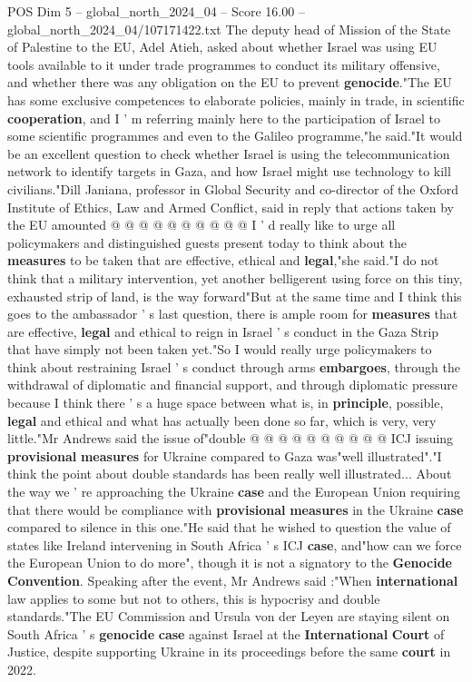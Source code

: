 \begin{textsample}{POS Dim 5 – global\_north\_2024\_04 – Score 16.00 – global\_north\_2024\_04/107171422.txt}
The deputy head of Mission of the State of Palestine to the EU, Adel Atieh, asked about whether Israel was using EU tools available to it under trade programmes to conduct its military offensive, and whether there was any obligation on the EU to prevent \textbf{genocide}."The EU has some exclusive competences to elaborate policies, mainly in trade, in scientific \textbf{cooperation}, and I ' m referring mainly here to the participation of Israel to some scientific programmes and even to the Galileo programme,"he said."It would be an excellent question to check whether Israel is using the telecommunication network to identify targets in Gaza, and how Israel might use technology to kill civilians."Dill Janiana, professor in Global Security and co-director of the Oxford Institute of Ethics, Law and Armed Conflict, said in reply that actions taken by the EU amounted @ @ @ @ @ @ @ @ @ @ I ' d really like to urge all policymakers and distinguished guests present today to think about the \textbf{measures} to be taken that are effective, ethical and \textbf{legal},"she said."I do not think that a military intervention, yet another belligerent using force on this tiny, exhausted strip of land, is the way forward"But at the same time and I think this goes to the ambassador ' s last question, there is ample room for \textbf{measures} that are effective, \textbf{legal} and ethical to reign in Israel ' s conduct in the Gaza Strip that have simply not been taken yet."So I would really urge policymakers to think about restraining Israel ' s conduct through arms \textbf{embargoes}, through the withdrawal of diplomatic and financial support, and through diplomatic pressure because I think there ' s a huge space between what is, in \textbf{principle}, possible, \textbf{legal} and ethical and what has actually been done so far, which is very, very little."Mr Andrews said the issue of"double @ @ @ @ @ @ @ @ @ @ ICJ issuing \textbf{provisional} \textbf{measures} for Ukraine compared to Gaza was"well illustrated"."I think the point about double standards has been really well illustrated...
About the way we ' re approaching the Ukraine \textbf{case} and the European Union requiring that there would be compliance with \textbf{provisional} \textbf{measures} in the Ukraine \textbf{case} compared to silence in this one."He said that he wished to question the value of states like Ireland intervening in South Africa ' s ICJ \textbf{case}, and"how can we force the European Union to do more", though it is not a signatory to the \textbf{Genocide} \textbf{Convention}.
Speaking after the event, Mr Andrews said :"When \textbf{international} law applies to some but not to others, this is hypocrisy and double standards."The EU Commission and Ursula von der Leyen are staying silent on South Africa ' s \textbf{genocide} \textbf{case} against Israel at the \textbf{International} \textbf{Court} of Justice, despite supporting Ukraine in its proceedings before the same \textbf{court} in 2022.

\end{textsample}
